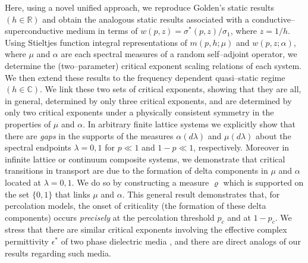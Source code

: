 \documentclass[english,12pt,jmp,graphicx]{revtex4-1}
\begin{document}
Here, using a novel unified approach, we reproduce Golden's
static results $(h\in\mathbb{R})$ and obtain the analogous static
results associated with a conductive--superconductive medium in terms
of $w(p,z)=\sigma^*(p,z)/\sigma_1$, where $z=1/h$. Using Stieltjes function
integral representations of $m(p,h;\mu)$ and $w(p,z;\alpha)$, where $\mu$ and
$\alpha$ are each spectral measures of a random self--adjoint operator, we
determine the (two--parameter) critical exponent scaling relations of
each system. We then extend these results to the frequency dependent
quasi--static regime $(h\in\mathbb{C})$. We link these two sets of
critical exponents, showing that they are all, in general, determined
by only three critical exponents, and are determined by only two
critical exponents under a physically consistent symmetry in the
properties of $\mu$ and $\alpha$. In arbitrary finite lattice systems we
explicitly show that there are \emph{gaps} in the supports of the measures
$\alpha(d\lambda)$ and $\mu(d\lambda)$ about the spectral endpoints $\lambda=0,1$ for $p\ll1$ and
$1-p\ll1$, respectively.
Moreover in infinite lattice or continuum composite systems, we
demonstrate that critical transitions in transport are due to the
formation of delta
components in $\mu$ and $\alpha$ located at
$\lambda=0,1$. We do so by constructing a measure $\varrho$ which is supported
on the set $\{0,1\}$ that links
$\mu$ and $\alpha$. This general
result demonstrates that, for percolation models, the onset of
criticality (the formation of these delta components) occurs
\emph{precisely} at the percolation threshold $p_c$ and at
$1-p_c$. We stress that there are similar critical exponents involving
the effective complex permittivity $\epsilon^*$ of two phase dielectric
media \cite{Clerc:AP-191,Bergman:SSP-147}, and there are direct
analogs of our results regarding such media.     
%
%
%
\end{document}
